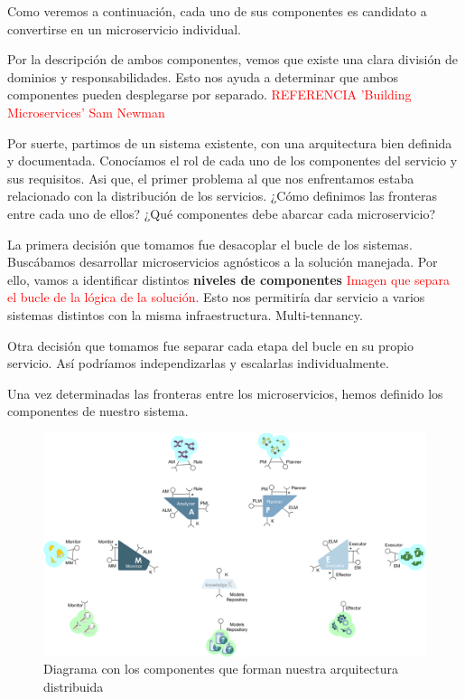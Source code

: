 Como veremos a continuación, cada uno de sus componentes es candidato a convertirse en un microservicio individual.

Por la descripción de ambos componentes, vemos que existe una clara división de dominios y responsabilidades. Esto nos ayuda a determinar que ambos componentes pueden desplegarse por separado. \textcolor{red}{REFERENCIA 'Building Microservices' Sam Newman}

Por suerte, partimos de un sistema existente, con una arquitectura bien definida y documentada. Conocíamos el rol de cada uno de los componentes del servicio y sus requisitos. Asi que, el primer problema al que nos enfrentamos estaba relacionado con la distribución de los servicios. ¿Cómo definimos las fronteras entre cada uno de ellos? ¿Qué componentes debe abarcar cada microservicio?

La primera decisión que tomamos fue desacoplar el bucle de los sistemas. Buscábamos desarrollar microservicios agnósticos a la solución manejada. Por ello, vamos a identificar distintos \textbf{niveles de componentes} \textcolor{red}{Imagen que separa el bucle de la lógica de la solución.} Esto nos permitiría dar servicio a varios sistemas distintos con la misma infraestructura. Multi-tennancy.

Otra decisión que tomamos fue separar cada etapa del bucle en su propio servicio. Así podríamos independizarlas y escalarlas individualmente.

Una vez determinadas las fronteras entre los microservicios, hemos definido los componentes de nuestro sistema.

\begin{figure}[htb]
  \centering
  \includegraphics[scale=0.3]{cap_arquitectura/images/mape-k-microservices}
  \caption{Diagrama con los componentes que forman nuestra arquitectura distribuida}
  \label{fig:mape-k-microservices}
\end{figure}

